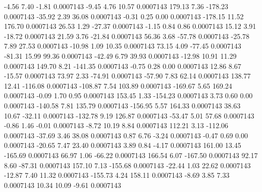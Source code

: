        -4.56        7.40       -1.81     0.0007143
       -9.45        4.76       10.57     0.0007143
      179.13        7.36     -178.23     0.0007143
      -35.92        2.39       36.08     0.0007143
       -0.31        0.25        0.00     0.0007143
     -178.15       11.52      176.70     0.0007143
       26.53        1.29      -27.37     0.0007143
       -1.15        0.84        0.86     0.0007143
       15.12        3.91      -18.72     0.0007143
       21.59        3.76      -21.84     0.0007143
       56.36        3.68      -57.78     0.0007143
      -25.78        7.89       27.53     0.0007143
      -10.98        1.09       10.35     0.0007143
       73.15        4.09      -77.45     0.0007143
      -81.31       15.99       99.36     0.0007143
      -42.49        6.79       39.93     0.0007143
      -12.98       10.91       11.29     0.0007143
      149.70        8.21     -141.35     0.0007143
       -0.75        0.28        0.00     0.0007143
       12.86        8.67      -15.57     0.0007143
       73.97        2.33      -74.91     0.0007143
      -57.90        7.83       62.14     0.0007143
      138.77       12.41     -116.08     0.0007143
     -108.87        7.54      103.89     0.0007143
     -169.67        5.65      169.24     0.0007143
       -0.09        1.70        0.95     0.0007143
      153.45        1.33     -154.23     0.0007143
        3.73        0.60        0.00     0.0007143
     -140.58        7.81      135.79     0.0007143
     -156.95        5.57      164.33     0.0007143
       38.63       10.67      -32.11     0.0007143
     -132.78        9.19      126.87     0.0007143
      -53.47        5.01       57.68     0.0007143
       -0.86        1.46       -0.01     0.0007143
       -8.72       10.19        8.84     0.0007143
      112.21        3.13     -112.06     0.0007143
      -37.69        3.46       38.08     0.0007143
        0.87        6.76       -3.24     0.0007143
       -0.47        0.69        0.00     0.0007143
      -20.65        7.47       23.40     0.0007143
        3.89        0.84       -4.17     0.0007143
      161.00       13.45     -165.69     0.0007143
       66.97        1.06      -66.22     0.0007143
      166.54        6.07     -167.50     0.0007143
       92.17        8.60      -87.31     0.0007143
      157.10        7.13     -155.68     0.0007143
      -22.44        1.03       22.62     0.0007143
      -12.87        7.40       11.32     0.0007143
     -155.73        4.24      158.11     0.0007143
       -8.69        3.85        7.33     0.0007143
       10.34       10.09       -9.61     0.0007143
